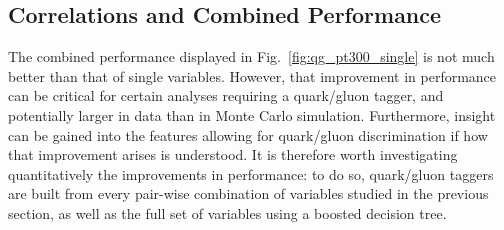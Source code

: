 \subsection{Correlations and Combined Performance}\label{sec:qg_combi}
The combined performance displayed in Fig.~\ref{fig:qg_pt300_single} is not much
better than that of single variables. However, that improvement in performance can
be critical for certain analyses requiring a quark/gluon tagger, and potentially larger in
data than in Monte Carlo simulation. Furthermore, insight can be gained into the 
features allowing for quark/gluon discrimination if how that improvement arises is
understood. It is therefore worth investigating quantitatively
the improvements in performance: to do so, quark/gluon taggers are built from
every pair-wise combination of variables studied in the previous section, as well as
the full set of variables using a boosted decision tree. 

